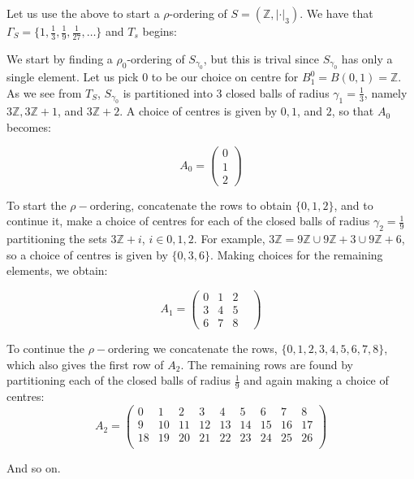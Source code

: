 \begin{example}
Let us use the above to start a $\rho$-ordering of $S=(\mathbb{Z}, \lvert \cdot \rvert_3)$. We have that $\Gamma_S=\{1, \frac{1}{3},\frac{1}{9},\frac{1}{27},\ldots \}$ and $T_s$ begins:

\begin{center}
\end{center}




We start by finding a $\rho_0$-ordering of $S_{\gamma_0}$, but this is trival since $S_{\gamma_0}$ has only a single element. Let us pick $0$ to be our choice on centre for $B^0_1=B(0,1)=\mathbb{Z}$. As we see from $T_S$, $S_{\gamma_0}$ is partitioned into $3$ closed balls of radius $\gamma_1=\frac{1}{3}$, namely $3\mathbb{Z}, 3\mathbb{Z}+1$, and $3\mathbb{Z}+2$. A choice of centres is given by $0,1$, and $2$, so that $A_0$ becomes:

\[A_0=
 \begin{pmatrix}
0 \\
1  \\
2 
\end{pmatrix}
\]


To start the $\rho-$ordering, concatenate the rows to obtain $\{0,1,2\}$, and to continue it, make a choice of centres for each of the closed balls of radius $\gamma_2=\frac{1}{9}$ partitioning the sets $3\mathbb{Z}+i$, $i \in 0,1,2$. For example, $3\mathbb{Z} =  9\mathbb{Z} \cup 9\mathbb{Z}+3 \cup 9\mathbb{Z}+6$, so a choice of centres is given by $\{0,3,6\}$. Making choices for the remaining elements, we obtain:

\[A_1=
 \begin{pmatrix}
0 & 1 &  2 & \\
3 & 4 &  5 & \\
6 & 7 &  8 &
\end{pmatrix}
\]

To continue the $\rho-$ordering we concatenate the rows, $\{0,1,2,3,4,5,6,7,8\}$, which also gives the first row of $A_2$. The remaining rows are found by partitioning each of the closed balls of radius $\frac{1}{9}$ and again making a choice of centres:
\[A_2=
 \begin{pmatrix}
0 & 1 &  2 & 3 & 4 & 5 & 6 & 7 & 8 \\
9 & 10 &  11 & 12 & 13 & 14 & 15 & 16 & 17 \\
18 & 19 &  20 & 21 & 22 & 23 & 24 & 25 & 26 \\
\end{pmatrix}
\]

And so on. 
\end{example}

